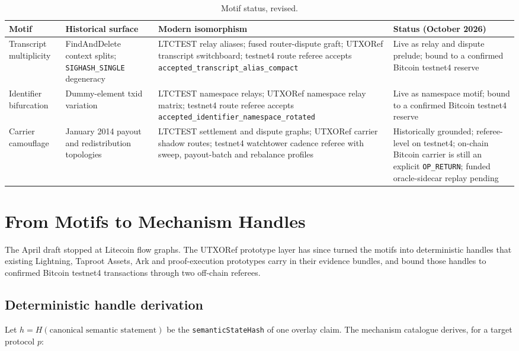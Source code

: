 \documentclass[11pt]{article}
\begin{document}
\begin{table}[t]
\centering
\small
\begin{tabular}{L{2.4cm}L{3.3cm}L{4.2cm}L{4.4cm}}
\toprule
Motif & Historical surface & Modern isomorphism & Status (October 2026) \\
\midrule
Transcript multiplicity & FindAndDelete context splits; \texttt{SIGHASH\_SINGLE} degeneracy & LTCTEST relay aliases; fused router-dispute graft; UTXORef transcript switchboard; testnet4 route referee accepts \texttt{accepted\_transcript\_alias\_compact} & Live as relay and dispute prelude; bound to a confirmed Bitcoin testnet4 reserve \\
Identifier bifurcation & Dummy-element txid variation & LTCTEST namespace relays; UTXORef namespace relay matrix; testnet4 route referee accepts \texttt{accepted\_identifier\_namespace\_rotated} & Live as namespace motif; bound to a confirmed Bitcoin testnet4 reserve \\
Carrier camouflage & January 2014 payout and redistribution topologies & LTCTEST settlement and dispute graphs; UTXORef carrier shadow routes; testnet4 watchtower cadence referee with sweep, payout-batch and rebalance profiles & Historically grounded; referee-level on testnet4; on-chain Bitcoin carrier is still an explicit \texttt{OP\_RETURN}; funded oracle-sidecar replay pending \\
\bottomrule
\end{tabular}
\caption{Motif status, revised.}
\label{tab:envelope}
\end{table}

\section{From Motifs to Mechanism Handles}
\label{sec:handles}

The April draft stopped at Litecoin flow graphs. The UTXORef prototype layer
\cite{dugan2026utxoref} has since turned the motifs into deterministic handles
that existing Lightning, Taproot Assets, Ark and proof-execution prototypes
carry in their evidence bundles, and bound those handles to confirmed Bitcoin
testnet4 transactions through two off-chain referees.

\subsection{Deterministic handle derivation}

Let $h = H(\text{canonical semantic statement})$ be the
\texttt{semanticStateHash} of one overlay claim. The mechanism catalogue derives,
for a target protocol $p$:
\end{document}
